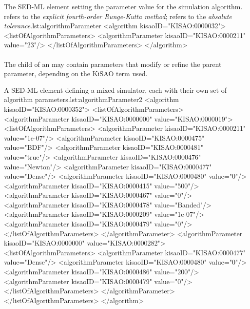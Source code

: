 \begin{myXmlLst}{The SED-ML  element setting the parameter value for the simulation algorithm.  refers to the \emph{explicit fourth-order Runge-Kutta method};  refers to the \emph{absolute tolerance}.}{lst:algorithmParameter}
<algorithm kisaoID="KISAO:0000032"> 
	<listOfAlgorithmParameters> 
		<algorithmParameter kisaoID="KISAO:0000211" value="23"/> 
	</listOfAlgorithmParameters>
</algorithm>
\end{myXmlLst}

\begin{blockChanged}
\paragraph*{}
The child  of an \AlgorithmParameter may contain parameters that modify or refine the parent parameter, depending on the KiSAO term used.  

\begin{myXmlLst}{A SED-ML  element defining a mixed simulator, each with their own set of algorithm parameters.}{lst:algorithmParameter2}
<algorithm kisaoID="KISAO:0000352">
    <listOfAlgorithmParameters>
        <algorithmParameter kisaoID="KISAO:0000000" value="KISAO:0000019">
            <listOfAlgorithmParameters>
                <algorithmParameter kisaoID="KISAO:0000211" value="1e-07"/>
                <algorithmParameter kisaoID="KISAO:0000475" value="BDF"/>
                <algorithmParameter kisaoID="KISAO:0000481" value="true"/>
                <algorithmParameter kisaoID="KISAO:0000476" value="Newton"/>
                <algorithmParameter kisaoID="KISAO:0000477" value="Dense"/>
                <algorithmParameter kisaoID="KISAO:0000480" value="0"/>
                <algorithmParameter kisaoID="KISAO:0000415" value="500"/>
                <algorithmParameter kisaoID="KISAO:0000467" value="0"/>
                <algorithmParameter kisaoID="KISAO:0000478" value="Banded"/>
                <algorithmParameter kisaoID="KISAO:0000209" value="1e-07"/>
                <algorithmParameter kisaoID="KISAO:0000479" value="0"/>
            </listOfAlgorithmParameters>
        </algorithmParameter>
        <algorithmParameter kisaoID="KISAO:0000000" value="KISAO:0000282">
            <listOfAlgorithmParameters>
                <algorithmParameter kisaoID="KISAO:0000477" value="Dense"/>
                <algorithmParameter kisaoID="KISAO:0000480" value="0"/>
                <algorithmParameter kisaoID="KISAO:0000486" value="200"/>
                <algorithmParameter kisaoID="KISAO:0000479" value="0"/>
            </listOfAlgorithmParameters>
        </algorithmParameter>
    </listOfAlgorithmParameters>
</algorithm>
\end{myXmlLst}


\end{blockChanged}



